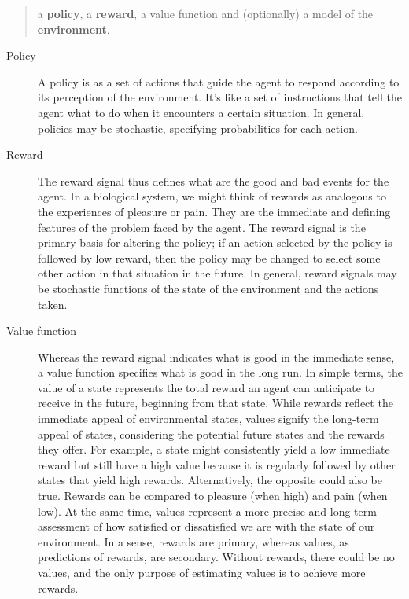 \documentclass[
  letterpaper,
  DIV=11,
  numbers=noendperiod]{scrreprt}
\theoremstyle{definition}
\theoremstyle{remark}
\begin{document}
\begin{quote}
a \textbf{policy}, a \textbf{reward}, a value function and (optionally)
a model of the \textbf{environment}.
\end{quote}

\begin{description}
\item[Policy]
A policy is as a set of actions that guide the agent to respond
according to its perception of the environment. It's like a set of
instructions that tell the agent what to do when it encounters a certain
situation. In general, policies may be stochastic, specifying
probabilities for each action.
\item[Reward]
The reward signal thus defines what are the good and bad events for the
agent. In a biological system, we might think of rewards as analogous to
the experiences of pleasure or pain. They are the immediate and defining
features of the problem faced by the agent. The reward signal is the
primary basis for altering the policy; if an action selected by the
policy is followed by low reward, then the policy may be changed to
select some other action in that situation in the future. In general,
reward signals may be stochastic functions of the state of the
environment and the actions taken.
\item[Value function]
Whereas the reward signal indicates what is good in the immediate sense,
a value function specifies what is good in the long run. In simple
terms, the value of a state represents the total reward an agent can
anticipate to receive in the future, beginning from that state. While
rewards reflect the immediate appeal of environmental states, values
signify the long-term appeal of states, considering the potential future
states and the rewards they offer. For example, a state might
consistently yield a low immediate reward but still have a high value
because it is regularly followed by other states that yield high
rewards. Alternatively, the opposite could also be true. Rewards can be
compared to pleasure (when high) and pain (when low). At the same time,
values represent a more precise and long-term assessment of how
satisfied or dissatisfied we are with the state of our environment. In a
sense, rewards are primary, whereas values, as predictions of rewards,
are secondary. Without rewards, there could be no values, and the only
purpose of estimating values is to achieve more rewards.


\end{description}
\end{document}
